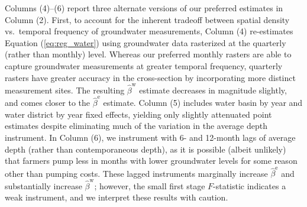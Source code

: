 Columns (4)--(6) report three alternate versions of our preferred estimates in Column (2). First, to account for the inherent tradeoff between spatial density vs.\ temporal frequency of groundwater measurements, Column (4)  re-estimates  Equation (\ref{eq:reg_water}) using groundwater data rasterized at the quarterly (rather than monthly) level. Whereas our preferred monthly rasters are able to capture groundwater measurements at greater temporal frequency, quarterly rasters have greater accuracy in the cross-section by incorporating more distinct measurement sites. The resulting $\hat\beta^{\text{w}}$ estimate decreases in magnitude slightly, and comes closer to the $\hat\beta^{\text{e}}$ estimate.
Column (5) includes water basin by year and water district by year fixed effects, yielding only slightly attenuated point estimates despite eliminating much of the variation in the average depth instrument.
In Column (6), we instrument with 6- and 12-month lags of average depth (rather than contemporaneous depth), as it is possible (albeit unlikely) that farmers pump less in months with lower groundwater levels for some reason other than pumping costs. These lagged instruments marginally increase $\hat\beta^{\text{e}}$ and substantially increase $\hat\beta^{\text{w}}$; however, the small first stage $F$-statistic indicates a weak instrument, and we interpret these results with caution.



\FloatBarrier
